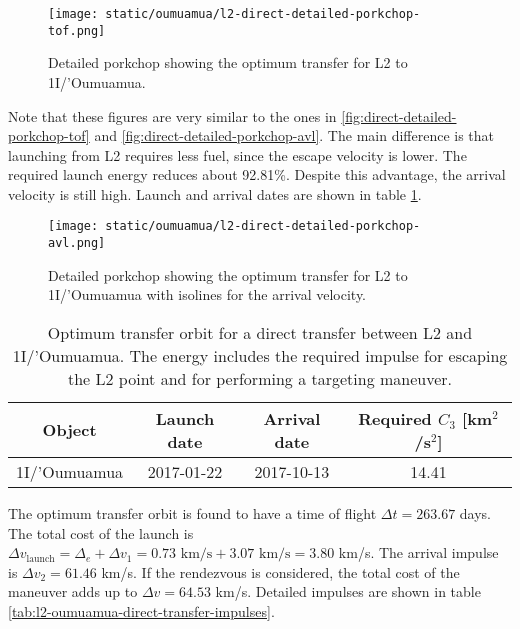 \begin{figure}[H]
  \centering
  \texttt{[image: static/oumuamua/l2-direct-detailed-porkchop-tof.png]}
        \caption[Detailed porkchop showing the optimum transfer for
        L2 to 1I/'Oumuamua with the time of flight.]{Detailed porkchop showing the optimum transfer for
        L2 to 1I/'Oumuamua. 
  }
  \label{fig:l2-oumuamua-optimum-porkchop}
\end{figure}

Note that these figures are very similar to the ones in
\ref{fig:direct-detailed-porkchop-tof} and
\ref{fig:direct-detailed-porkchop-avl}. The main difference is that launching
from L2 requires less fuel, since the escape velocity is lower. The required
launch energy reduces about 92.81\%. Despite this advantage, the arrival
velocity is still high. Launch and arrival dates are shown in table
\ref{tab:l2-oumuamua-direct-transfer-optimum}.

\begin{figure}[H]
  \centering
  \texttt{[image: static/oumuamua/l2-direct-detailed-porkchop-avl.png]}
        \caption[Detailed porkchop showing the optimum transfer for
        L2 to 1I/'Oumuamua with the arrival velocity.]{Detailed porkchop showing the
        optimum transfer for L2 to 1I/'Oumuamua with isolines for the arrival
        velocity.}
  \label{fig:l2-oumuamua-optimum-porkchop-avl}
\end{figure}

\vspace{1cm}
\begin{table}[H]
  \centering
  \begin{tabular}{|c|c|c|c|}
    \hline
    Object & Launch date & Arrival date & Required $C_3$ [km$^2$/s$^2$] \\
    \hline
    1I/'Oumuamua & 2017-01-22 & 2017-10-13 & 14.41 \\
    \hline
  \end{tabular}
  \caption[Optimum transfer orbit for a direct transfer between L2 and
        1I/'Oumuamua.]{Optimum transfer orbit for a direct transfer between
        L2 and 1I/'Oumuamua. The energy includes the required impulse for
        escaping the L2 point and for performing a targeting maneuver.}
  \label{tab:l2-oumuamua-direct-transfer-optimum}
\end{table}

The optimum transfer orbit is found to have a time of flight $\Delta t = 263.67$
days. The total cost of the launch is $\Delta v_\text{launch} = \Delta_e +
\Delta v_1 = 0.73 \text{ km/s} + 3.07 \text{ km/s} = 3.80$ km/s. The arrival
impulse is $\Delta v_2 = 61.46$ km/s. If the rendezvous is considered, the total
cost of the maneuver adds up to $\Delta v = 64.53$ km/s. Detailed impulses are
shown in table \ref{tab:l2-oumuamua-direct-transfer-impulses}.

